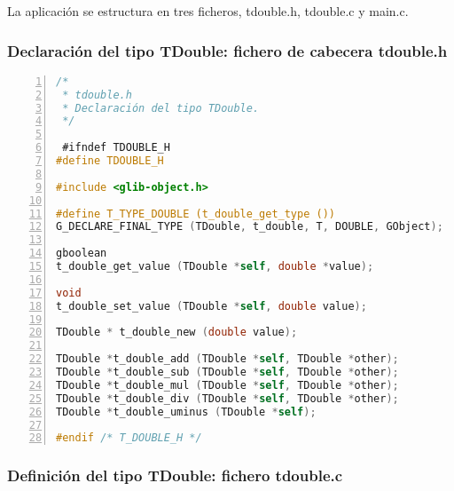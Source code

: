La aplicación se estructura en tres ficheros, \textsf{tdouble.h}, \textsf{tdouble.c} y \textsf{main.c}.

\subsubsection{Declaración del tipo \textsf{TDouble}: fichero de cabecera \textsf{tdouble.h}}

\begin{lstlisting}[language=C, numbers=left]
/*
 * tdouble.h
 * Declaración del tipo TDouble.
 */

 #ifndef TDOUBLE_H
#define TDOUBLE_H

#include <glib-object.h>

#define T_TYPE_DOUBLE (t_double_get_type ())
G_DECLARE_FINAL_TYPE (TDouble, t_double, T, DOUBLE, GObject);

gboolean
t_double_get_value (TDouble *self, double *value);

void
t_double_set_value (TDouble *self, double value);

TDouble * t_double_new (double value);

TDouble *t_double_add (TDouble *self, TDouble *other);
TDouble *t_double_sub (TDouble *self, TDouble *other);
TDouble *t_double_mul (TDouble *self, TDouble *other);
TDouble *t_double_div (TDouble *self, TDouble *other);
TDouble *t_double_uminus (TDouble *self);

#endif /* T_DOUBLE_H */
\end{lstlisting}

\subsubsection{Definición del tipo \textsf{TDouble}: fichero \textsf{tdouble.c}}


